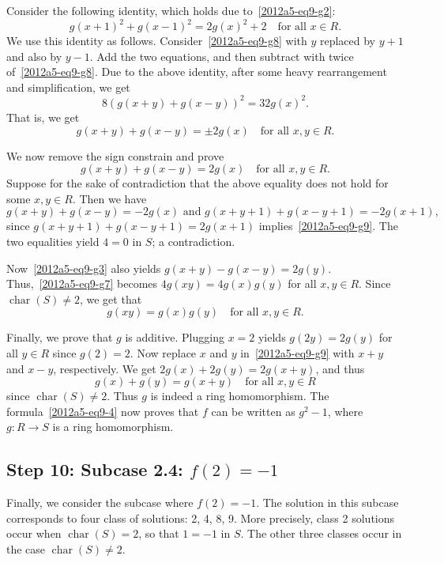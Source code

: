 \documentclass{article}
\DeclareMathOperator{\rchar}{char}
\begin{document}
Consider the following identity, which holds due to~\eqref{2012a5-eq9-g2}:
\[ g(x + 1)^2 + g(x - 1)^2 = 2 g(x)^2 + 2 \quad \text{for all } x \in R. \]
We use this identity as follows.
Consider~\eqref{2012a5-eq9-g8} with $y$ replaced by $y + 1$ and also by $y - 1$.
Add the two equations, and then subtract with twice of~\eqref{2012a5-eq9-g8}.
Due to the above identity, after some heavy rearrangement and simplification, we get
\[ 8 (g(x + y) + g(x - y))^2 = 32 g(x)^2. \]
That is, we get
\[ g(x + y) + g(x - y) = \pm 2 g(x) \quad \text{for all } x, y \in R. \]

We now remove the sign constrain and prove
\[ g(x + y) + g(x - y) = 2 g(x) \quad \text{for all } x, y \in R. \tag{9.g9}\label{2012a5-eq9-g9} \]
Suppose for the sake of contradiction that the above equality does not hold for some $x, y \in R$.
Then we have
\[ g(x + y) + g(x - y) = -2 g(x) \text{ and } g(x + y + 1) + g(x - y + 1) = -2 g(x + 1), \]
    since $g(x + y + 1) + g(x - y + 1) = 2 g(x + 1)$ implies~\eqref{2012a5-eq9-g9}.
The two equalities yield $4 = 0$ in $S$; a contradiction.

Now~\eqref{2012a5-eq9-g3} also yields $g(x + y) - g(x - y) = 2 g(y)$.
Thus,~\eqref{2012a5-eq9-g7} becomes $4 g(xy) = 4 g(x) g(y)$ for all $x, y \in R$.
Since $\rchar(S) \neq 2$, we get that
\[ g(xy) = g(x) g(y) \quad \text{for all } x, y \in R. \tag{9.g10}\label{2012a5-eq9-g10} \]

Finally, we prove that $g$ is additive.
Plugging $x = 2$ yields $g(2y) = 2g(y)$ for all $y \in R$ since $g(2) = 2$.
Now replace $x$ and $y$ in~\eqref{2012a5-eq9-g9} with $x + y$ and $x - y$, respectively.
We get $2 g(x) + 2 g(y) = 2 g(x + y)$, and thus
\[ g(x) + g(y) = g(x + y) \quad \text{for all } x, y \in R \]
    since $\rchar(S) \neq 2$.
Thus $g$ is indeed a ring homomorphism.
The formula~\eqref{2012a5-eq9-4} now proves that $f$ can be written as $g^2 - 1$, where $g : R \to S$ is a ring homomorphism.









\subsection*{Step 10: Subcase 2.4: $f(2) = -1$}

Finally, we consider the subcase where $f(2) = -1$.
The solution in this subcase corresponds to four class of solutions: 2, 4, 8, 9.
More precisely, class 2 solutions occur when $\rchar(S) = 2$, so that $1 = -1$ in $S$.
The other three classes occur in the case $\rchar(S) \neq 2$.
\end{document}
